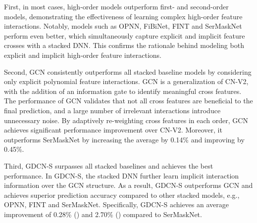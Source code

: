\documentclass[sigconf]{acmart}
\begin{document}
First, in most cases, high-order models outperform first- and second-order models, demonstrating the effectiveness of learning complex high-order feature interactions. Notably, models such as OPNN, FiBiNet, FINT and SerMaskNet perform even better, which simultaneously capture explicit and implicit feature crosses with a stacked DNN. This confirms the rationale behind modeling both explicit and implicit high-order feature interactions. 

Second, GCN consistently outperforms all stacked baseline models by considering only explicit polynomial feature interactions. GCN is a generalization of CN-V2, with the addition of an information gate to identify meaningful cross features. The performance of GCN validates that not all cross features are beneficial to the final prediction, and a large number of irrelevant interactions introduce unnecessary noise. By adaptively re-weighting cross features in each order, GCN achieves significant performance improvement over CN-V2. Moreover, it outperforms SerMaskNet by increasing the average  by 0.14\% and improving  by 0.45\%.

Third, GDCN-S surpasses all stacked baselines and achieves the best performance. In GDCN-S, the stacked DNN further learn implicit interaction information over the GCN structure. As a result,  GDCN-S outperforms GCN and achieves superior prediction accuracy compared to other stacked models, e.g., OPNN, FINT and SerMaskNet. Specifically, GDCN-S achieves an average improvement of 0.28\% () and 2.70\% () compared to SerMaskNet. 
\end{document}
